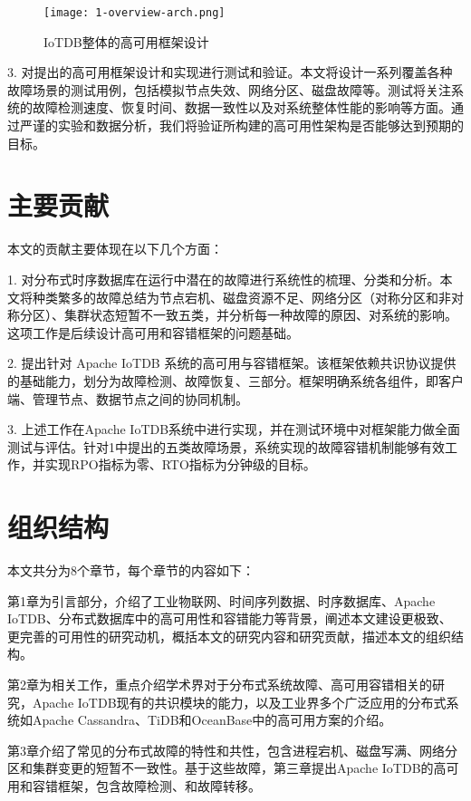 \begin{figure}
  \centering
  \texttt{[image: 1-overview-arch.png]}
  \caption{IoTDB整体的高可用框架设计}
  \label{fig:c01-overview-arch}
\end{figure}

3. 对提出的高可用框架设计和实现进行测试和验证。本文将设计一系列覆盖各种故障场景的测试用例，包括模拟节点失效、网络分区、磁盘故障等。测试将关注系统的故障检测速度、恢复时间、数据一致性以及对系统整体性能的影响等方面。通过严谨的实验和数据分析，我们将验证所构建的高可用性架构是否能够达到预期的目标。



\section{主要贡献}

本文的贡献主要体现在以下几个方面：

1. 对分布式时序数据库在运行中潜在的故障进行系统性的梳理、分类和分析。本文将种类繁多的故障总结为节点宕机、磁盘资源不足、网络分区（对称分区和非对称分区）、集群状态短暂不一致五类，并分析每一种故障的原因、对系统的影响。这项工作是后续设计高可用和容错框架的问题基础。

2. 提出针对 Apache IoTDB 系统的高可用与容错框架。该框架依赖共识协议提供的基础能力，划分为故障检测、故障恢复、\failover 三部分。框架明确系统各组件，即客户端、管理节点、数据节点之间的协同机制。

3. 上述工作在Apache IoTDB系统中进行实现，并在测试环境中对框架能力做全面测试与评估。针对1中提出的五类故障场景，系统实现的故障容错机制能够有效工作，并实现RPO指标为零、RTO指标为分钟级的目标。


\section{组织结构}
本文共分为8个章节，每个章节的内容如下：

第1章为引言部分，介绍了工业物联网、时间序列数据、时序数据库、Apache IoTDB、分布式数据库中的高可用性和容错能力等背景，阐述本文建设更极致、更完善的可用性的研究动机，概括本文的研究内容和研究贡献，描述本文的组织结构。

第2章为相关工作，重点介绍学术界对于分布式系统故障、高可用容错相关的研究，Apache IoTDB现有的共识模块的能力，以及工业界多个广泛应用的分布式系统如Apache Cassandra、TiDB和OceanBase中的高可用方案的介绍。

第3章介绍了常见的分布式故障的特性和共性，包含进程宕机、磁盘写满、网络分区和集群变更的短暂不一致性。基于这些故障，第三章提出Apache IoTDB的高可用和容错框架，包含故障检测、\failover 和故障转移。

